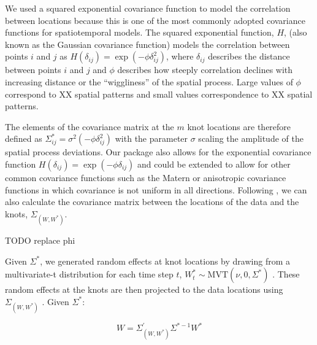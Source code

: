 \documentclass[12pt,english]{article}
\begin{document}
\begin{spacing}{1.25}
We used a squared exponential covariance function to model the correlation
between locations because this is one of the most commonly adopted covariance
functions for spatiotemporal models. The squared exponential function, $H$,
(also known as the Gaussian covariance function) models the correlation between
points $i$ and $j$ as $H(\delta_{ij}) = \exp \left(-\phi \delta_{ij}^2
\right)$, where $\delta_{ij}$ describes the distance between points $i$ and $j$
and $\phi$ describes how steeply correlation declines with increasing distance
or the ``wiggliness'' of the spatial process. Large values of $\phi$ correspond
to XX spatial patterns and small values correspondence to XX spatial patterns.

The elements of the covariance matrix at the $m$ knot locations are therefore
defined as $\Sigma_{ij}^*=\sigma^2 \left( -\phi \delta_{ij}^2 \right)$ with the
parameter $\sigma$ scaling the amplitude of the spatial process deviations. Our
package also allows for the exponential covariance function $H(\delta_{ij}) =
\exp \left(-\phi \delta_{ij} \right)$ and could be extended to allow for other
common covariance functions such as the Matern or anisotropic covariance
functions in which covariance is not uniform in all directions. 
Following \citet{latimer2009}, we can also calculate the covariance matrix
between the locations of the data and the knots, 
$\Sigma_{\left(W, W^* \right)}$. 

TODO replace phi



Given $\Sigma^*$, we generated random effects at knot
locations by drawing from a multivariate-t distribution for each time step $t$, 
$W_t^*\sim \mathrm{MVT}\left( \nu, 0, \Sigma^{*} \right)$ .
These random effects at the knots are then projected to the data locations using
$\Sigma_{\left( W,W^{*} \right)}$ \citep{latimer2009}.
Given ${\Sigma}^{*}$:

\begin{equation}
W=\Sigma_{\left(W,W^* \right)}^{'} \Sigma^{*-1}W^*
\end{equation}


\end{spacing}
\end{document}

